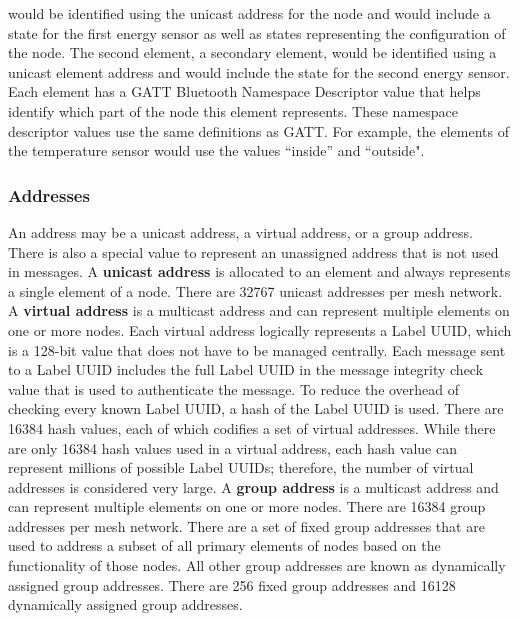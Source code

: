 \documentclass[\main/main.tex]{subfiles}
\begin{document}
would be identified using the unicast address for the node and would include a state for the first energy sensor as well as states representing the configuration of the node. The second element, a secondary element, would be identified using a unicast element address and would include the state for the second energy sensor.
\newline\newline
Each element has a GATT Bluetooth Namespace Descriptor value that helps identify which part of the node this element represents. These namespace descriptor values use the same definitions as GATT. For example, the elements of the temperature sensor would use the values “inside” and “outside".

\subsubsection{Addresses}
An address may be a unicast address, a virtual address, or a group address. There is also a special value to represent an unassigned address that is not used in messages.
\newline\newline
A \textbf{unicast address} is allocated to an element and always represents a single element of a node. There are 32767 unicast addresses per mesh network.
\newline\newline
A \textbf{virtual address} is a multicast address and can represent multiple elements on one or more nodes. Each virtual address logically represents a Label UUID, which is a 128-bit value that does not have to be managed centrally. Each message sent to a Label UUID includes the full Label UUID in the message integrity check value that is used to authenticate the message. To reduce the overhead of checking every known Label UUID, a hash of the Label UUID is used. There are 16384 hash values, each of which codifies a set of virtual addresses. While there are only 16384 hash values used in a virtual address, each hash value can represent millions of possible Label UUIDs; therefore, the number of virtual addresses is considered very large.
\newline\newline
A \textbf{group address} is a multicast address and can represent multiple elements on one or more nodes. There are 16384 group addresses per mesh network. There are a set of fixed group addresses that are used to address a subset of all primary elements of nodes based on the functionality of those nodes. All other group addresses are known as dynamically assigned group addresses. There are 256 fixed group addresses and 16128 dynamically assigned group addresses.
\end{document}
